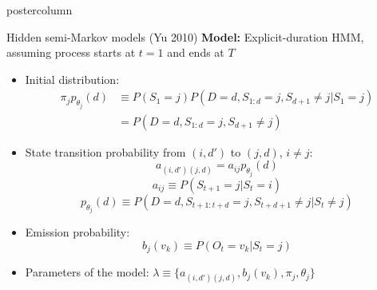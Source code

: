 \documentclass[final,hyperref={pdfpagelabels=false}]{beamer}
\begin{document}
\begin{frame}
\begin{columns}
\begin{column}{.50\textwidth}
\begin{beamercolorbox}[center,wd=\textwidth]{postercolumn}
\begin{minipage}[T]{.98\textwidth}
{\begin{block}{Hidden semi-Markov models (Yu 2010)}
                \vskip0.5cm
                \textbf{Model:} Explicit-duration HMM, assuming process starts at $t=1$ and ends at $T$
                \vskip0cm
                \begin{itemize}
                    \item[\bullet] Initial distribution:
                    {\small
                        \begin{align*}
                            \pi_j p_{\theta_j}(d) & \equiv P(S_1 = j)P(D=d, S_{1:d} = j, S_{d+1} \neq j | S_1 = j)\\
                            & = P(D=d, S_{1:d} = j, S_{d+1} \neq j)
                        \end{align*}
                    }
                    \item[\bullet] State transition probability from $(i,d')$ to $(j,d)$, $i \neq j$:
                    {\small
                        $$a_{(i,d')(j,d)}=a_{ij}p_{\theta_j}(d)$$
                        $$a_{ij} \equiv P(S_{t+1} = j | S_t = i)$$
                        $$p_{\theta_j}(d) \equiv P(D=d, S_{t+1:t+d} = j, S_{t+d+1} \neq j | S_t \neq j)$$
                    }
                    \item[\bullet] Emission probability:
                    {\small $$b_{j}(v_k) \equiv P(O_t = v_k | S_{t} = j)$$}
                    \item[\bullet] Parameters of the model: $\lambda \equiv \{a_{(i,d')(j,d)},b_{j}(v_{k}), \pi_{j}, \theta_j\}$
                \end{itemize}

            \end{block}
          }
        \end{minipage}
      \end{beamercolorbox}
    \end{column}


\end{columns}
\end{frame}
\end{document}
